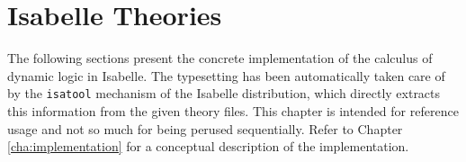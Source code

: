 \chapter{Isabelle Theories}
\label{cha:isabelle-theories}

The following sections present the concrete implementation of the calculus of
dynamic logic in Isabelle. The typesetting has been automatically taken care of
by the \verb|isatool| mechanism of the Isabelle distribution, which directly
extracts this information from the given theory files. This chapter is intended
for reference usage and not so much for being perused sequentially. Refer to
Chapter \ref{cha:implementation} for a conceptual description of the
implementation.





